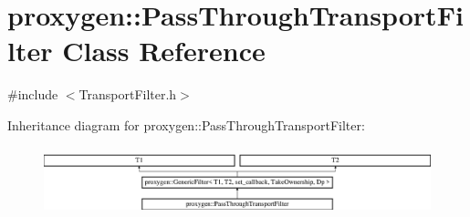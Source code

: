\section{proxygen\+:\+:Pass\+Through\+Transport\+Filter Class Reference}
\label{classproxygen_1_1PassThroughTransportFilter}


{\ttfamily \#include $<$Transport\+Filter.\+h$>$}

Inheritance diagram for proxygen\+:\+:Pass\+Through\+Transport\+Filter\+:\begin{figure}[H]
\begin{center}
\leavevmode
\includegraphics[height=2.024096cm]{classproxygen_1_1PassThroughTransportFilter}
\end{center}
\end{figure}
